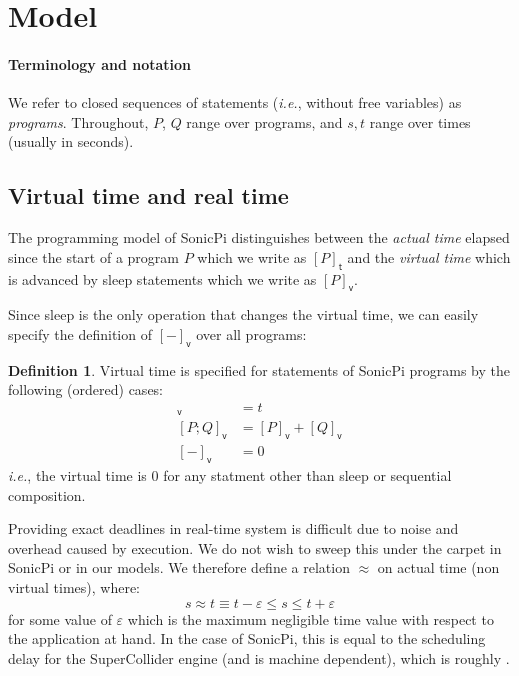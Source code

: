 \documentclass[preprint]{sigplanconf}
\renewcommand{\leq}{\leqslant}
\newcommand{\note}[1]{{\color{blue}{#1}}}
\theoremstyle{definition}
\newtheorem{definition}{Definition}
\newcommand{\sleep}{\mathsf{sleep}\;}
\newcommand{\sleepOp}{\textsf{sleep}}
\newcommand{\lang}{SonicPi}
\newcommand{\vtime}[1]{[#1]_{\mathsf{v}}}
\newcommand{\etime}[1]{[#1]_{\mathsf{t}}}
\newcommand{\ie}{\emph{i.e.}}
\begin{document}
\section{Model}

\paragraph{Terminology and notation}
We refer to closed sequences of statements (\ie{}, without free
variables) as \emph{programs}. Throughout, $P$, $Q$ range over programs,
and $s, t$ range over times (usually in seconds).

\subsection{Virtual time and real time}

The programming model of \lang{} distinguishes between the
\emph{actual time} elapsed since the start of a program $P$ which we
write as $\etime{P}$ and the \emph{virtual time} which is advanced by
\sleepOp{} statements which we write as $\vtime{P}$.

Since \sleepOp{} is the only operation that changes the virtual
time, we can easily specify the definition of $\vtime{-}$ over all programs:
%
\begin{definition}
Virtual time is specified for statements of \lang{} programs 
by the following (ordered) cases:
%
\begin{align*}
\vtime{\sleep t} & = t \\ 
\vtime{P; Q} & = \vtime{P} + \vtime{Q} \\
\vtime{-} & = 0
\end{align*}
%
\ie{}, the virtual time is $0$ 
for any statment other than \sleepOp{} or sequential composition.
\label{sleep-spec}
\end{definition}

Providing exact deadlines in real-time system is difficult due 
to noise and overhead caused by execution. We do not wish to sweep
this under the carpet in \lang{} or in our models. We therefore define
a relation $\approx$ on actual time (non virtual times), where:
\begin{equation}
s \approx t
\equiv
t - \varepsilon \leq s \leq t + \varepsilon 
\end{equation}
%
for some value of $\varepsilon$ which is the maximum negligible 
time value with respect to the application at hand. In the case of
\lang{}, this is equal to the scheduling delay for the SuperCollider
engine (and is machine dependent), which is roughly \note{X}.
\end{document}
